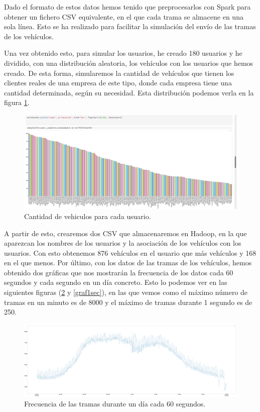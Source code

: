Dado el formato de estos datos hemos tenido que preprocesarlos con Spark
para obtener un fichero CSV equivalente, en el que cada trama se almacene
en una sola línea. Esto se ha realizado para facilitar la simulación del
envío de las tramas de los vehículos.

Una vez obtenido esto, para simular los usuarios, he creado 180 usuarios y
he dividido, con una distribución aleatoria, los vehículos con los usuarios
que hemos creado. De esta forma, simularemos la cantidad de vehículos que
tienen los clientes reales de una empresa de este tipo, donde cada empresa
tiene una cantidad determinada, según su necesidad. Esta distribución
podemos verla en la figura \ref{userGraf}.

\begin{figure}[htp]
\centering
\includegraphics[scale=0.3]{Imagenes/graf1.png}
\caption{Cantidad de vehiculos para cada usuario.}
\label{userGraf}
\end{figure}

A partir de esto, crearemos dos CSV que almacenaremos en Hadoop, en la que
aparezcan los nombres de los usuarios y la asociación de los vehículos con
los usuarios. Con esto obtenemos 876 vehículos en el usuario que más
vehículos y 168 en el que menos. Por último, con los datos de las tramas de los 
vehículos, hemos obtenido dos gráficas que nos mostrarán la frecuencia de
los datos cada 60 segundos y cada segundo en un día concreto. Esto lo
podemos ver en las siguientes figuras (\ref{graf60sec} y \ref{graf1sec}),
en las que vemos como el máximo número de tramas en un minuto es de 8000 y
el máximo de tramas durante 1 segundo es de 250.

\begin{figure}[htp]
\centering
\includegraphics[scale=0.26]{Imagenes/graf2.png}
\caption{Frecuencia de las tramas durante un día cada 60 segundos.}
\label{graf60sec}
\end{figure}

